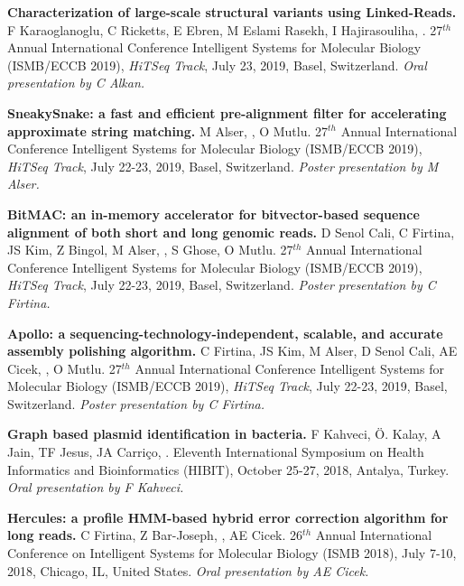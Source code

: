 \vspace{-.2cm}
  {\bf Characterization of large-scale structural variants using Linked-Reads.}
  F Karaoglanoglu, C Ricketts, E Ebren, M Eslami Rasekh, I Hajirasouliha, \calkan{}.
27$^{th}$ Annual
International Conference Intelligent Systems for Molecular Biology (ISMB/ECCB 2019), {\em HiTSeq Track},
 July 23, 2019, Basel, Switzerland. {\it Oral presentation by C Alkan.}


\clearpage

\vspace{-.2cm}
  {\bf SneakySnake: a fast and efficient pre-alignment filter for accelerating approximate string matching.}
  M Alser, \calkan{}, O Mutlu.
27$^{th}$ Annual
International Conference Intelligent Systems for Molecular Biology (ISMB/ECCB 2019), {\em HiTSeq Track},
 July 22-23, 2019, Basel, Switzerland. {\it Poster presentation by M Alser.}

\vspace{-.2cm}
   {\bf BitMAC: an in-memory accelerator for bitvector-based sequence alignment of both
short and long genomic reads.}
  D Senol Cali, C Firtina, JS Kim, Z Bingol, M Alser, \calkan{},
S Ghose, O Mutlu.
27$^{th}$ Annual
International Conference Intelligent Systems for Molecular Biology (ISMB/ECCB 2019), {\em HiTSeq Track},
 July 22-23, 2019, Basel, Switzerland. {\it Poster presentation by C Firtina.}

\vspace{-.2cm}
   {\bf Apollo: a sequencing-technology-independent, scalable, and accurate assembly polishing algorithm.}
  C Firtina, JS Kim, M Alser, D Senol Cali, AE Cicek, \calkan{}, O Mutlu.
27$^{th}$ Annual
International Conference Intelligent Systems for Molecular Biology (ISMB/ECCB 2019), {\em HiTSeq Track},
 July 22-23, 2019, Basel, Switzerland. {\it Poster presentation by C Firtina.}


\vspace{-.2cm}
       {\bf Graph based plasmid identification in bacteria.}
       F Kahveci, Ö. Kalay, A Jain, TF Jesus, JA Carriço, \calkan{}.
       Eleventh International Symposium on Health Informatics and Bioinformatics (HIBIT), October 25-27, 2018, Antalya, Turkey.
       {\it Oral presentation by F Kahveci.}
       
\vspace{-.2cm}
        {\bf Hercules: a profile HMM-based hybrid error correction algorithm for long reads.} C Firtina, Z Bar-Joseph, \calkan{}, AE Cicek. 26$^{th}$ Annual International Conference on Intelligent Systems for Molecular Biology (ISMB 2018), July 7-10, 2018, Chicago, IL, United States.
       {\it Oral presentation by AE Cicek.}

